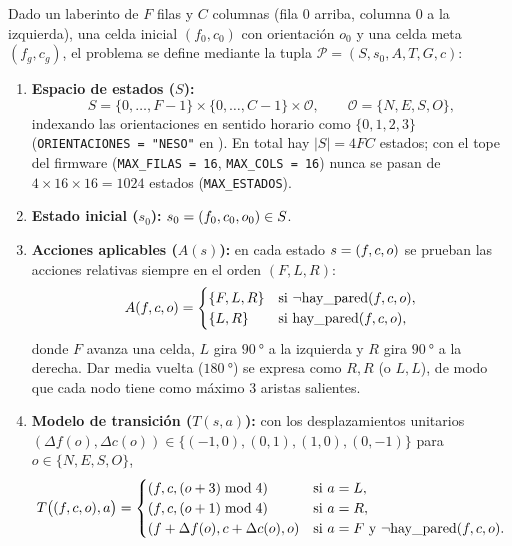 \begin{definicion}
\label{def:problema-busqueda}
Dado un laberinto de $F$ filas y $C$ columnas (fila $0$ arriba, columna $0$ a la izquierda), una celda inicial $(f_0, c_0)$ con orientación $o_0$ y una celda meta $(f_g, c_g)$, el problema se define mediante la tupla $\mathcal{P} = (S, s_0, A, T, G, c)$:
\begin{enumerate}[leftmargin=1.6em,itemsep=3pt]
  \item \textbf{Espacio de estados ($S$):}
  \[
    S = \{0, \dots, F-1\} \times \{0, \dots, C-1\} \times \mathcal{O}, \qquad \mathcal{O} = \{N, E, S, O\},
  \]
  indexando las orientaciones en sentido horario como $\{0, 1, 2, 3\}$ (\texttt{ORIENTACIONES = "NESO"} en ). En total hay $|S| = 4FC$ estados; con el tope del firmware (\texttt{MAX\_FILAS = 16}, \texttt{MAX\_COLS = 16}) nunca se pasan de $4 \times 16 \times 16 = 1024$ estados (\texttt{MAX\_ESTADOS}).

  \item \textbf{Estado inicial ($s_0$):} $s_0 = (f_0,c_0,o_0) \in S$.

  \item \textbf{Acciones aplicables ($A(s)$):} en cada estado $s = (f,c,o)$ se prueban las acciones relativas siempre en el orden $(F, L, R)$:
  \[
    A(f,c,o) =
    \begin{cases}
      \{F, L, R\} & \text{si } \neg\mathrm{hay\_pared}(f, c, o), \\
      \{L, R\}    & \text{si } \mathrm{hay\_pared}(f, c, o),
    \end{cases}
  \]
  donde $F$ avanza una celda, $L$ gira $\SI{90}{\degree}$ a la izquierda y $R$ gira $\SI{90}{\degree}$ a la derecha. Dar media vuelta ($\SI{180}{\degree}$) se expresa como $R, R$ (o $L, L$), de modo que cada nodo tiene como máximo 3 aristas salientes.

  \item \textbf{Modelo de transición ($T(s, a)$):} con los desplazamientos unitarios $(\Delta f(o), \Delta c(o)) \in \{(-1,0), (0,1), (1,0), (0,-1)\}$ para $o \in \{N, E, S, O\}$,
  \[
    T\bigl((f,c,o), a\bigr) =
    \begin{cases}
      (f,c,(o + 3) \bmod 4) & \text{si } a = L, \\
      (f,c,(o + 1) \bmod 4) & \text{si } a = R, \\
      (f + \Delta f(o),c + \Delta c(o),o) & \text{si } a = F \text{ y } \neg\mathrm{hay\_pared}(f, c, o).
    \end{cases}
  \]


\end{enumerate}
\end{definicion}
